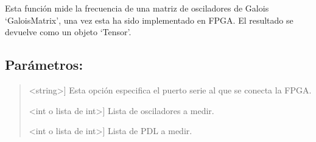 \documentclass[letterpaper,10pt,english]{sphinxmanual}
\begin{document}
\begin{fulllineitems}
\begin{fulllineitems}
\begin{quote}
\begin{description}
\end{description}
\end{quote}

\end{fulllineitems}


\begin{fulllineitems}
\label{\detokenize{myfpga:myfpga.ring_osc.GaloisMatrix.medir}}
\pysigstartsignatures
{}
\pysigstopsignatures
\sphinxAtStartPar
Esta función mide la frecuencia de una matriz de osciladores de Galois 
‘GaloisMatrix’, una vez esta ha sido implementado en FPGA. El resultado
se devuelve como un objeto ‘Tensor’.


\subsection{Parámetros:}
\label{\detokenize{myfpga:id2}}\begin{quote}
\begin{description}
\sphinxlineitem{puerto}{[}\textless{}string\textgreater{}{]}
\sphinxAtStartPar
Esta opción especifica el puerto serie al que se conecta la 
FPGA.

\sphinxlineitem{osc}{[}\textless{}int o lista de int\textgreater{}{]}
\sphinxAtStartPar
Lista de osciladores a medir.

\sphinxlineitem{pdl}{[}\textless{}int o lista de int\textgreater{}{]}
\sphinxAtStartPar
Lista de PDL a medir.


\end{description}
\end{quote}
\end{fulllineitems}
\end{fulllineitems}
\end{document}
